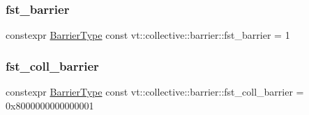 \subsubsection{\texorpdfstring{fst\+\_\+barrier}{fst\_barrier}}
{\footnotesize\ttfamily constexpr \hyperlink{namespacevt_a25e481f0d6bbc7204db23d1c87a62e77}{Barrier\+Type} const vt\+::collective\+::barrier\+::fst\+\_\+barrier = 1}

\mbox{\label{namespacevt_1_1collective_1_1barrier_a02bc7e6a890bd33f1e0b1b264326099c}} 
\subsubsection{\texorpdfstring{fst\+\_\+coll\+\_\+barrier}{fst\_coll\_barrier}}
{\footnotesize\ttfamily constexpr \hyperlink{namespacevt_a25e481f0d6bbc7204db23d1c87a62e77}{Barrier\+Type} const vt\+::collective\+::barrier\+::fst\+\_\+coll\+\_\+barrier = 0x8000000000000001}

